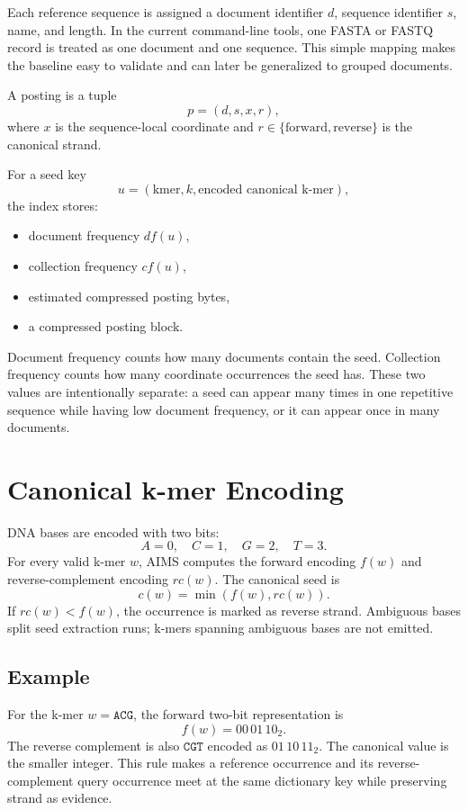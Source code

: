 \documentclass[11pt]{article}
\begin{document}
Each reference sequence is assigned a document identifier \(d\), sequence identifier \(s\), name, and length. In the current command-line tools, one FASTA or FASTQ record is treated as one document and one sequence. This simple mapping makes the baseline easy to validate and can later be generalized to grouped documents.

A posting is a tuple
\[
  p = (d, s, x, r),
\]
where \(x\) is the sequence-local coordinate and \(r \in \{\text{forward}, \text{reverse}\}\) is the canonical strand.

For a seed key
\[
  u = (\text{kmer}, k, \text{encoded canonical k-mer}),
\]
the index stores:
\begin{itemize}
  \item document frequency \(df(u)\),
  \item collection frequency \(cf(u)\),
  \item estimated compressed posting bytes,
  \item a compressed posting block.
\end{itemize}

Document frequency counts how many documents contain the seed. Collection frequency counts how many coordinate occurrences the seed has. These two values are intentionally separate: a seed can appear many times in one repetitive sequence while having low document frequency, or it can appear once in many documents.

\section{Canonical k-mer Encoding}

DNA bases are encoded with two bits:
\[
  A=0,\quad C=1,\quad G=2,\quad T=3.
\]
For every valid k-mer \(w\), AIMS computes the forward encoding \(f(w)\) and reverse-complement encoding \(rc(w)\). The canonical seed is
\[
  c(w) = \min(f(w), rc(w)).
\]
If \(rc(w) < f(w)\), the occurrence is marked as reverse strand. Ambiguous bases split seed extraction runs; k-mers spanning ambiguous bases are not emitted.

\subsection{Example}

For the k-mer \(w=\texttt{ACG}\), the forward two-bit representation is
\[
  f(w) = 00\,01\,10_2.
\]
The reverse complement is also \(\texttt{CGT}\) encoded as \(01\,10\,11_2\). The canonical value is the smaller integer. This rule makes a reference occurrence and its reverse-complement query occurrence meet at the same dictionary key while preserving strand as evidence.
\end{document}
